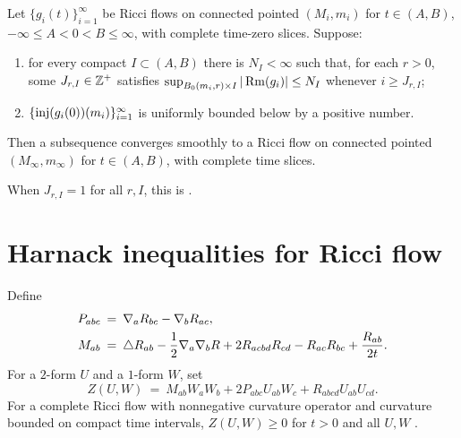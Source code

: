 \begin{corollary}
  \label{cor:kl-convergent-subsequences-ricci-flow-solutions-existence-convergent-subsequences-ricci-flow-solutions-3}
\label{accumulate3}

Let $\{g_i(t)\}_{i=1}^\infty$ be Ricci flows on connected pointed
$(M_i,m_i)$ for $t\in(A,B)$, $-\infty\leq A<0<B\leq\infty$, with complete
time-zero slices. Suppose:
\begin{enumerate}
\item for every compact $I\subset(A,B)$ there is $N_I<\infty$ such that,
for each $r>0$, some $J_{r,I}\in{\mathbb Z}^+$ satisfies
$\sup_{B_0(m_i,r)\times I}|\operatorname{Rm}(g_i)|\leq N_I$ whenever $i\geq J_{r,I}$;
\item $\{\operatorname{inj}(g_i(0))(m_i)\}_{i=1}^\infty$ is uniformly bounded below by a
positive number.
\end{enumerate}
Then a subsequence converges smoothly to a Ricci flow on connected pointed
$(M_\infty,m_\infty)$ for $t\in(A,B)$, with complete time slices.
\end{corollary}

When $J_{r,I}=1$ for all $r,I$, this is
\cite[Main Theorem]{Hamiltonnn}.

\section{Harnack inequalities for Ricci flow} \label{appharnack}

Define
\begin{align}
P_{abc}\: & = \:\nabla_aR_{bc}-\nabla_bR_{ac},\\
M_{ab}\: & = \:\triangle R_{ab}-\frac12\nabla_a\nabla_bR
+2R_{acbd}R_{cd}-R_{ac}R_{bc}+\frac{R_{ab}}{2t}. \notag
\end{align}
For a $2$-form $U$ and a $1$-form $W$, set
\begin{equation}
Z(U,W)\:=\:M_{ab}W_aW_b+2P_{abc}U_{ab}W_c+R_{abcd}U_{ab}U_{cd}.
\end{equation}
For a complete Ricci flow with nonnegative curvature operator and curvature
bounded on compact time intervals, $Z(U,W)\geq0$ for $t>0$ and all $U,W$
\cite[Theorem 14.1]{Hamilton}.

